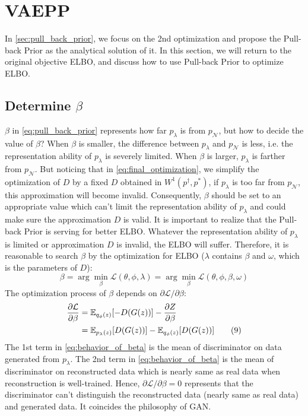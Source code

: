 \section{VAEPP}\label{sec:vaepp}


In \cref{sec:pull_back_prior}, we focus on the 2nd optimization and propose the Pull-back Prior as the analytical solution of it. In this section, we will return to the original objective ELBO, and discuss how to use Pull-back Prior to optimize ELBO.

\subsection{Determine $\beta$}

$\beta$ in \cref{eq:pull_back_prior} represents how far $p_\lambda$ is from $p_\mathcal{N}$, but how to decide the value of $\beta$? When $\beta$ is smaller, the difference between $p_\lambda$ and $p_\mathcal{N}$ is less, i.e. the representation ability of $p_\lambda$ is severely limited. When $\beta$ is larger, $p_\lambda$ is farther from $p_\mathcal{N}$. But noticing that in \cref{eq:final_optimization}, we simplify the optimization of $D$ by a fixed $D$ obtained in $W^1(p^\dag, p^*)$, if $p_\lambda$ is too far from $p_\mathcal{N}$, this approximation will become invalid. Consequently, $\beta$ should be set to an appropriate value which can't limit the representation ability of $p_\lambda$ and could make sure the approximation $D$ is valid. It is important to realize that the Pull-back Prior is serving for better ELBO. Whatever the representation ability of $p_\lambda$ is limited or approximation $D$ is invalid, the ELBO will suffer. Therefore, it is reasonable to search $\beta$ by the optimization for ELBO ($\lambda$ contains $\beta$ and $\omega$, which is the parameters of $D$):
\begin{equation}
	\beta = \arg \min_{\beta} \mathcal{L}(\theta, \phi, \lambda) = \arg \min_{\beta} \mathcal{L}(\theta, \phi, \beta, \omega) \tag{8}
\end{equation}
The optimization process of $\beta$ depends on $\partial \mathcal{L}/\partial \beta$:
\begin{align*}\label{eq:behavior_of_beta}
\frac{\partial \mathcal{L}}{\partial \beta} &= \operatorname{\mathbb{E}}_{q_\phi(z)}[ -D(G(z))] - \frac{\partial Z}{\partial \beta} \\
&= \operatorname{\mathbb{E}}_{p_\lambda(z)}[ D(G(z))] - \operatorname{\mathbb{E}}_{q_\phi(z)}[ D(G(z))]  \tag{9}
\end{align*}
The 1st term in \cref{eq:behavior_of_beta} is the mean of discriminator on data generated from $p_\lambda$. The 2nd term in \cref{eq:behavior_of_beta} is the mean of discriminator on reconstructed data which is nearly same as real data when reconstruction is well-trained. Hence, $\partial \mathcal{L}/\partial \beta = 0$ represents that the discriminator can't distinguish the reconstructed data (nearly same as real data) and generated data. It coincides the philosophy of GAN. 

